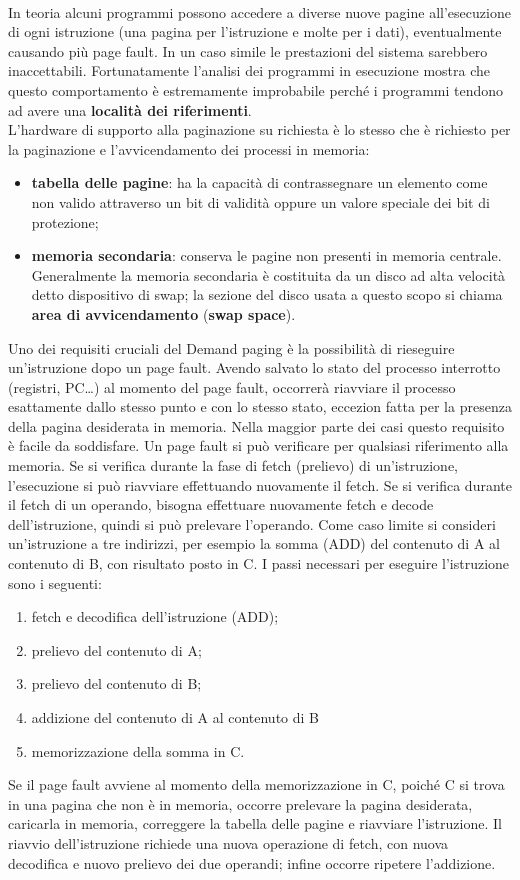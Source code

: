 \documentclass{article}
\begin{document}
				\\In teoria alcuni programmi possono accedere a diverse nuove pagine all’esecuzione di ogni istruzione (una pagina per l’istruzione e molte per i dati), eventualmente causando più page fault. In un caso simile le prestazioni del sistema sarebbero inaccettabili. Fortunatamente l’analisi dei programmi in esecuzione mostra che questo comportamento è estremamente improbabile perché i programmi tendono ad avere una \textbf{località dei riferimenti}.
				\\L’hardware di supporto alla paginazione su richiesta è lo stesso che è richiesto per la paginazione e l’avvicendamento dei processi in memoria:
				\begin{itemize}
					\item \textbf{tabella delle pagine}: ha la capacità di contrassegnare un elemento come non valido attraverso un bit di validità oppure un valore speciale dei bit di protezione;
					\item \textbf{memoria secondaria}: conserva le pagine non presenti in memoria centrale. Generalmente la memoria secondaria è costituita da un disco ad alta velocità detto dispositivo di swap; la sezione del disco usata a questo scopo si chiama \textbf{area di avvicendamento} (\textbf{swap space}).
				\end{itemize}
				Uno dei requisiti cruciali del Demand paging è la possibilità di rieseguire un'istruzione dopo un page fault. Avendo salvato lo stato del processo interrotto (registri, PC\dots) al momento del page fault, occorrerà riavviare il processo esattamente dallo stesso punto e con lo stesso stato, eccezion fatta per la presenza della pagina desiderata in memoria. Nella maggior parte dei casi questo requisito è facile da soddisfare. Un page fault si può verificare per qualsiasi riferimento alla memoria. Se si verifica durante la fase di fetch (prelievo) di un’istruzione, l’esecuzione si può riavviare effettuando nuovamente il fetch. Se si verifica durante il fetch di un operando, bisogna effettuare nuovamente fetch e decode dell’istruzione, quindi si può prelevare l’operando. Come caso limite si consideri un’istruzione a tre indirizzi, per esempio la somma (ADD) del contenuto di A al contenuto di B, con risultato posto in C. I passi necessari per eseguire l’istruzione sono i seguenti:
				\begin{enumerate}
					\item fetch e decodifica dell’istruzione (ADD);
					\item prelievo del contenuto di A;
					\item prelievo del contenuto di B;
					\item addizione del contenuto di A al contenuto di B
					\item memorizzazione della somma in C.
				\end{enumerate}
				Se il page fault avviene al momento della memorizzazione in C, poiché C si trova in una pagina che non è in memoria, occorre prelevare la pagina desiderata, caricarla in memoria, correggere la tabella delle pagine e riavviare l’istruzione. Il riavvio dell’istruzione richiede una nuova operazione di fetch, con nuova decodifica e nuovo prelievo dei due operandi; infine occorre ripetere l’addizione.
\end{document}
